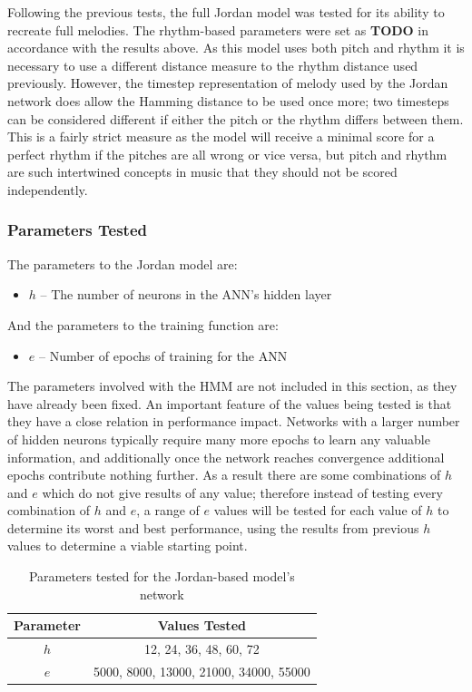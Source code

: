 \documentclass[ author={Stephen Livermore-Tozer},
				supervisor={Dr. Peter Flach},
				degree={MEng},
				title={Algorithmic Co-composition Using Machine Learning},
				subtitle={},
				type={research},
				year={2016} ]{dissertation}
\begin{document}
	Following the previous tests, the full Jordan model was tested for its ability to recreate full melodies. The rhythm-based parameters were set as \textbf{TODO} in accordance with the results above. As this model uses both pitch and rhythm it is necessary to use a different distance measure to the rhythm distance used previously. However, the timestep representation of melody used by the Jordan network does allow the Hamming distance to be used once more; two timesteps can be considered different if either the pitch or the rhythm differs between them. This is a fairly strict measure as the model will receive a minimal score for a perfect rhythm if the pitches are all wrong or vice versa, but pitch and rhythm are such intertwined concepts in music that they should not be scored independently.
	
	\subsubsection{Parameters Tested}
	
	The parameters to the Jordan model are:
	\begin{itemize}
		\item $h$ -- The number of neurons in the ANN's hidden layer
	\end{itemize}
	And the parameters to the training function are:
	\begin{itemize}
		\item $e$ -- Number of epochs of training for the ANN
	\end{itemize}
	
	The parameters involved with the HMM are not included in this section, as they have already been fixed. An important feature of the values being tested is that they have a close relation in performance impact. Networks with a larger number of hidden neurons typically require many more epochs to learn any valuable information, and additionally once the network reaches convergence additional epochs contribute nothing further. As a result there are some combinations of $h$ and $e$ which do not give results of any value; therefore instead of testing every combination of $h$ and $e$, a range of $e$ values will be tested for each value of $h$ to determine its worst and best performance, using the results from previous $h$ values to determine a viable starting point. 
	
	\begin{table}[h]
		\begin{center}
			\begin{tabular}{cc}
				\toprule
				Parameter & Values Tested\\
				\hline
				$h$ & 12, 24, 36, 48, 60, 72\\
				$e$ & 5000, 8000, 13000, 21000, 34000, 55000\\
				\bottomrule
			\end{tabular}
		\end{center}
		\caption{Parameters tested for the Jordan-based model's network}
		\label{tab:jordan-net-parameters}
	\end{table}
	
\end{document}

